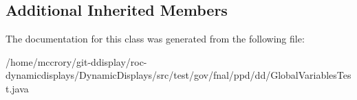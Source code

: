 \subsection*{Additional Inherited Members}


The documentation for this class was generated from the following file\-:\begin{DoxyCompactItemize}
\item 
/home/mccrory/git-\/ddisplay/roc-\/dynamicdisplays/\-Dynamic\-Displays/src/test/gov/fnal/ppd/dd/Global\-Variables\-Test.\-java\end{DoxyCompactItemize}
